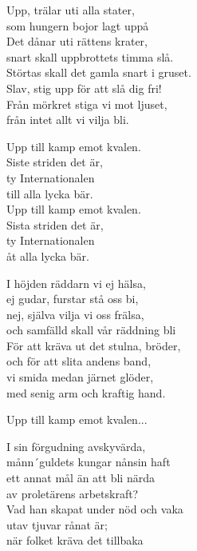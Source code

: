 \par
\vspace{10pt}
Upp, trälar uti alla stater,\\
som hungern bojor lagt uppå\\
Det dånar uti rättens krater,\\
snart skall uppbrottets timma slå.\\
Störtas skall det gamla snart i gruset.\\
Slav, stig upp för att slå dig fri!\\
Från mörkret stiga vi mot ljuset,\\
från intet allt vi vilja bli.\par
\vspace{10pt}
Upp till kamp emot kvalen.\\
Siste striden det är,\\
ty Internationalen\\
till alla lycka bär.\\
Upp till kamp emot kvalen.\\
Sista striden det är,\\
ty Internationalen\\
åt alla lycka bär.\par
\vspace{10pt}
I höjden räddarn vi ej hälsa,\\
ej gudar, furstar stå oss bi,\\
nej, själva vilja vi oss frälsa,\\
och samfälld skall vår räddning bli\\
För att kräva ut det stulna, bröder,\\
och för att slita andens band,\\
vi smida medan järnet glöder,\\
med senig arm och kraftig hand.\par
\vspace{10pt}
Upp till kamp emot kvalen...\par
\vspace{10pt}
I sin förgudning avskyvärda,\\
månn´guldets kungar nånsin haft\\
ett annat mål än att bli närda\\
av proletärens arbetskraft?\\
Vad han skapat under nöd och vaka\\
utav tjuvar rånat är;\\
när folket kräva det tillbaka\\
